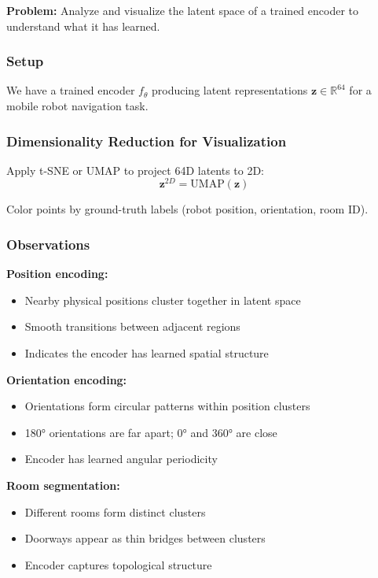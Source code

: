 \textbf{Problem:} Analyze and visualize the latent space of a trained encoder to understand what it has learned.

\subsubsection{Setup}

We have a trained encoder $f_\theta$ producing latent representations $\mathbf{z} \in \mathbb{R}^{64}$ for a mobile robot navigation task.

\subsubsection{Dimensionality Reduction for Visualization}

Apply t-SNE or UMAP to project 64D latents to 2D:
\begin{equation}
\mathbf{z}^{2D} = \text{UMAP}(\mathbf{z})
\label{eq:umap}
\end{equation}

Color points by ground-truth labels (robot position, orientation, room ID).

\subsubsection{Observations}

\textbf{Position encoding:}
\begin{itemize}
    \item Nearby physical positions cluster together in latent space
    \item Smooth transitions between adjacent regions
    \item Indicates the encoder has learned spatial structure
\end{itemize}

\textbf{Orientation encoding:}
\begin{itemize}
    \item Orientations form circular patterns within position clusters
    \item 180° orientations are far apart; 0° and 360° are close
    \item Encoder has learned angular periodicity
\end{itemize}

\textbf{Room segmentation:}
\begin{itemize}
    \item Different rooms form distinct clusters
    \item Doorways appear as thin bridges between clusters
    \item Encoder captures topological structure
\end{itemize}

